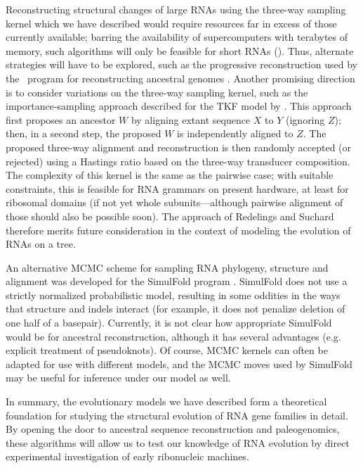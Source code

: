 \documentclass[10pt]{article}
\begin{document}

Reconstructing structural changes of large RNAs
using the three-way sampling kernel which we have described
would require resources far in excess of those currently available;
barring the availability of supercomputers with terabytes of memory,
such algorithms will only be feasible for short RNAs ().
Thus, alternate strategies will have to be explored, such as the
progressive reconstruction used by the \ortheus\ program for
reconstructing ancestral genomes \cite{PatenHolmesBirney2008}.
Another promising direction is to consider variations on the three-way sampling kernel,
such as the importance-sampling approach described for the TKF model
by \cite{RedelingsSuchard2005}.
This approach first proposes an ancestor $W$ by aligning extant
sequence $X$ to $Y$ (ignoring $Z$); then, in a second step, the proposed $W$ is
independently aligned to $Z$. The proposed three-way alignment and
reconstruction is then randomly accepted (or rejected) using a
Hastings ratio based on the three-way transducer composition. The
complexity of this kernel is the same as the pairwise case;
with suitable constraints, this is feasible for RNA
grammars on present hardware, at least for ribosomal domains (if not
yet whole subunits---although pairwise alignment of those should also
be possible soon). The approach of Redelings and Suchard therefore
merits future consideration in the context of modeling the evolution
of RNAs on a tree.

An alternative MCMC scheme for sampling RNA phylogeny, structure and alignment was developed for the SimulFold program \cite{MeyerMiklos2007}.
SimulFold does not use a strictly normalized probabilistic model, resulting in some oddities in the ways that structure and indels interact
(for example, it does not penalize deletion of one half of a basepair).
Currently, it is not clear how appropriate SimulFold would be for ancestral reconstruction,
although it has several advantages (e.g. explicit treatment of pseudoknots).
Of course, MCMC kernels can often be adapted for use with different models, and the MCMC moves used by SimulFold may be useful for inference under our model as well.

In summary, the evolutionary models we have described form a theoretical
foundation for studying the structural evolution of RNA gene families
in detail. By opening the door to ancestral sequence reconstruction
and paleogenomics, these algorithms will allow us to test our
knowledge of RNA evolution by direct experimental investigation
of early ribonucleic machines.
\end{document}
